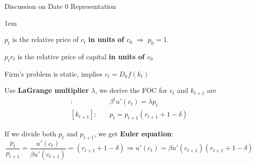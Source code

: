\documentclass[11pt,aspectratio=43,usenames,dvipsnames]{beamer}
\let\olditemize=\itemize
\let\endolditemize=\enditemize
\renewenvironment{itemize}{\olditemize \itemsep1em}{\endolditemize}
\theoremstyle{definition}
\begin{document}
\begin{frame}{Discussion on Date 0 Representation}
\label{slide:Discussion_on_Date_0_Representation}

\begin{itemize}
    \item $ p_{t} $ is the relative price of $ c_{t} $ \textbf{in units of $ c_{0} $} $ \Rightarrow  $ $ p_{0} = 1 $.
    \item $ p_{t} r_{t} $ is the relative price of capital \textbf{in units of $ c_{0} $}
    \item Firm's problem is static, implies $ r_{t} = D_{k}f(k_{t}) $
    \item Use \textbf{LaGrange multiplier} $ \lambda $, we derive the FOC for $ c_{t} $ and $ k_{t+1} $ are
    \begin{align*}
        [c_{t}]: \quad
            &\beta^{t} u'(c_t) = \lambda p_{t}
        \\
        [k_{t+1}]: \quad
            & p_{t} = p_{t+1} (r_{t+1} + 1 - \delta )
    \end{align*}
    \item If we divide both $ p_{t} $ and $ p_{t+1} $, we get \textbf{Euler equation}:
    \begin{equation*}
            \frac{p_{t}}{p_{t+1}} = \frac{u'(c_{t})}{\beta u'(c_{t+1})} = (r_{t+1} + 1 - \delta)
            \Rightarrow
            u'(c_{t}) = \beta u'(c_{t+1}) (r_{t+1} + 1 - \delta)
    \end{equation*}

\end{itemize}
\end{frame}
\end{document}

